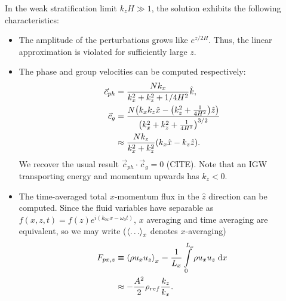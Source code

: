 \documentclass[twocolumn,
        nofootinbib,
        usenames, %
        dvipsnames %
    ]{revtex4-1}%
\DeclarePairedDelimiter\ev{\langle}{\rangle}
\DeclarePairedDelimiter\p{\lparen}{\rparen}
\begin{document}
In the weak stratification limit $k_zH \gg 1$, the solution exhibits the
following characteristics:
\begin{itemize}
    \item The amplitude of the perturbations grows like $e^{z/2H}$. Thus, the
        linear approximation is violated for sufficiently large $z$.

    \item The phase and group velocities can be computed respectively:
        \begin{align}
            \vec{c}_{ph} &= \frac{Nk_x}{k_x^2 + k_z^2 + 1/4H^2} \hat{k},\\
            \vec{c}_{g} &= \frac{N\p*{k_xk_z\hat{x}
                - \p*{k_z^2 + \frac{1}{4H^2}}\hat{z}}}
                {\p*{k_x^2 + k_z^2 + \frac{1}{4H^2}}^{3/2}} \nonumber\\
                &\approx \frac{Nk_z}{k_x^2 + k_z^2}\p*{k_x\hat{x} - k_z\hat{z}}.
        \end{align}
        We recover the usual result $\vec{c}_{ph} \cdot \vec{c}_g = 0$ (CITE).
        Note that an IGW transporting energy and momentum upwards has $k_z < 0$.


    \item The time-averaged total $x$-momentum flux in the $\hat{z}$ direction
        can be computed. Since the fluid variables have separable as $f(x, z, t)
        = f(z)e^{i(k_{0x}x - \omega_0 t)}$, $x$ averaging and time averaging are
        equivalent, so we may write ($\ev*{\dots}_x$ denotes $x$-averaging)
        \begin{align}
            F_{px, z} &\equiv \ev*{\rho u_x u_z}_x =
                \frac{1}{L_x}\int_0^{L_x}\limits \rho u_x u_z\;\mathrm{d}x
                    \nonumber\\
                &\approx -\frac{A^2}{2}\rho_{ref}\frac{k_z}{k_x}.
                    \label{eq:fpx_lin}
        \end{align}


\end{itemize}
\end{document}

